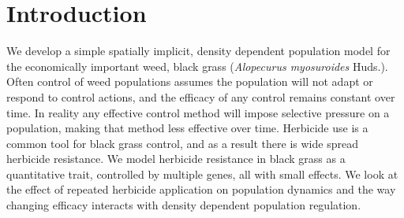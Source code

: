 \documentclass[12pt, a4paper]{article}
\begin{document}
\title{}
\author{Shaun R. Coutts$^\ddag$, Rob Freckleton$^\dag$, Helen Hick$^\dag$, Dylan Childs$^\dag$, }
\maketitle
\section{Introduction}
We develop a simple spatially implicit, density dependent population model for the economically important weed, black grass (\textit{Alopecurus myosuroides} Huds.). Often control of weed populations assumes the population will not adapt or respond to control actions, and the efficacy of any control remains constant over time. In reality any effective control method will impose selective pressure on a population, making that method less effective over time. Herbicide use is a common tool for black grass control, and as a result there is wide spread herbicide resistance. We model herbicide resistance in black grass as a quantitative trait, controlled by multiple genes, all with small effects. We look at the effect of repeated herbicide application on population dynamics and the way changing efficacy interacts with density dependent population regulation.     
\end{document}
